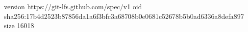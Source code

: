 version https://git-lfs.github.com/spec/v1
oid sha256:17b4d2523b87856da1a6f3bfc3a68708b0e0681c52678b5b0ad6336a8defa897
size 16018
